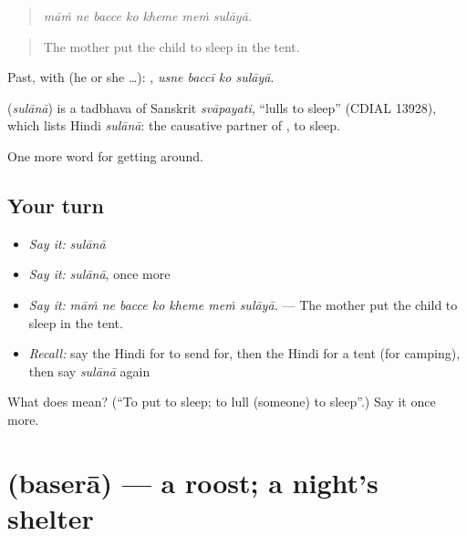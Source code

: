 \begin{quote}
      
\end{quote}

\begin{quote}
\emph{māṁ ne bacce ko kheme meṁ sulāyā.}
\end{quote}

\begin{quote}
The mother put the child to sleep in the tent.
\end{quote}

Past, with  (he or she …):    , \emph{usne baccī ko sulāyā}.

\begin{cousinweb}
\textbf{} (\emph{sulānā}) is a tadbhava of Sanskrit \emph{svāpayati}, \textquotedblleft{}lulls to sleep\textquotedblright{} (CDIAL 13928), which lists Hindi \emph{sulānā}: the causative partner of , to sleep.
\end{cousinweb}

\begin{grammarlens}[title={What you've built}]
One more word for getting around.
\end{grammarlens}

\subsection*{Your turn}
\begin{itemize}
\raggedright
  \item \emph{Say it:} \emph{sulānā}
  \item \emph{Say it:} \emph{sulānā}, once more
  \item \emph{Say it:} \emph{māṁ ne bacce ko kheme meṁ sulāyā.} — The mother put the child to sleep in the tent.
  \item \emph{Recall:} say the Hindi for to send for, then the Hindi for a tent (for camping), then say \emph{sulānā} again
\end{itemize}

\begin{tcolorbox}[breakable,colback=teal!4,colframe=teal!35!black,title={Before you move on}]
What does  mean? (\textquotedblleft{}To put to sleep; to lull (someone) to sleep\textquotedblright{}.) Say it once more.
\end{tcolorbox}
\section[\texorpdfstring{\hi{बसेरा} (baserā)}{बसेरा (baserā)}]{ (baserā) — a roost; a night's shelter}

